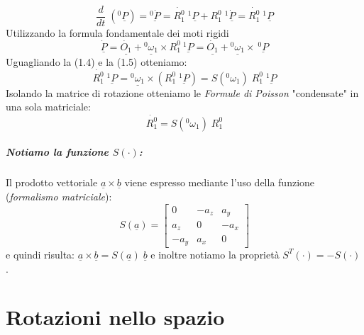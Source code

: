 \begin{equation}
	\dfrac{d}{dt} \; (^0\underline{P}) = \underline{^0\dot{P}} = \dot{R_{1}^{0}}\; ^1\underline{P} + R_{1}^{0} \; ^1\underline{\dot{P}} = \dot{R_{1}^{0}}\; ^1\underline{P}
\end{equation}
Utilizzando la formula fondamentale dei moti rigidi 
\begin{equation}
	\underline{\dot{P}} = \underline{\dot{O_{1}}} + \underline{^0\omega_{1}} \times R_{1}^{0}\: \underline{^1P} = \underline{\dot{O_{1}}} + \underline{^0\omega_{1}} \times \: \underline{^0P}
\end{equation}
Uguagliando la (1.4) e la (1.5) otteniamo: 
\begin{equation}
	\dot{R_{1}^{0}}\;\underline{^1P} = \underline{^0\omega_{1}} \times ( R_{1}^{0} \; \underline{^1P}) = S(^0\omega_{1}) \; R_{1}^{0} \; \underline{^1P}
\end{equation} 
Isolando la matrice di rotazione otteniamo le \emph{Formule di Poisson} "condensate" in una sola matriciale:
\begin{equation}
	\dot{R_{1}^{0}} = S(^0\omega_{1}) \; R_{1}^{0} 
\end{equation}

\subparagraph{Notiamo la funzione $S(\cdot)$:}
Il prodotto vettoriale $ \underline{a} \times \underline{b} $ viene espresso mediante l'uso della funzione (\emph{formalismo matriciale}):
\begin{equation*}
	S(\underline{a}) = 
	\begin{bmatrix}
		0 & -a_z & a_y \\
		a_z & 0 & -a_x \\
		-a_y & a_x & 0
	\end{bmatrix}
\end{equation*}
e quindi risulta: $\underline{a} \times \underline{b} = S(\underline{a}) \; \underline{b}$ e inoltre notiamo la proprietà $S^T(\cdot) = - S(\cdot)$.

\section{Rotazioni nello spazio}
